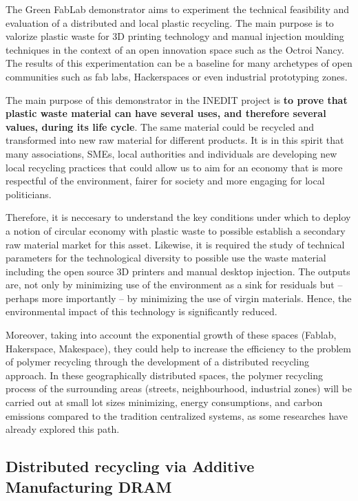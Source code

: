 \documentclass[
  11pt,
]{article}
\begin{document}
The Green FabLab demonstrator aims to experiment the technical
feasibility and evaluation of a distributed and local plastic recycling.
The main purpose is to valorize plastic waste for 3D printing technology
and manual injection moulding techniques in the context of an open
innovation space such as the Octroi Nancy. The results of this
experimentation can be a baseline for many archetypes of open
communities such as fab labs, Hackerspaces or even industrial
prototyping zones.

The main purpose of this demonstrator in the INEDIT project is
\textbf{to prove that plastic waste material can have several uses, and
therefore several values, during its life cycle}. The same material
could be recycled and transformed into new raw material for different
products. It is in this spirit that many associations, SMEs, local
authorities and individuals are developing new local recycling practices
that could allow us to aim for an economy that is more respectful of the
environment, fairer for society and more engaging for local politicians.

Therefore, it is neccesary to understand the key conditions under which
to deploy a notion of circular economy with plastic waste to possible
establish a secondary raw material market for this asset. Likewise, it
is required the study of technical parameters for the technological
diversity to possible use the waste material including the open source
3D printers and manual desktop injection. The outputs are, not only by
minimizing use of the environment as a sink for residuals but -- perhaps
more importantly -- by minimizing the use of virgin materials. Hence,
the environmental impact of this technology is significantly reduced.

Moreover, taking into account the exponential growth of these spaces
(Fablab, Hakerspace, Makespace), they could help to increase the
efficiency to the problem of polymer recycling through the development
of a distributed recycling approach. In these geographically distributed
spaces, the polymer recycling process of the surrounding areas (streets,
neighbourhood, industrial zones) will be carried out at small lot sizes
minimizing, energy consumptions, and carbon emissions compared to the
tradition centralized systems, as some researches have already explored
this path.

\hypertarget{distributed-recycling-via-additive-manufacturing-dram}{%
\subsection{Distributed recycling via Additive Manufacturing
DRAM}\label{distributed-recycling-via-additive-manufacturing-dram}}
\end{document}
